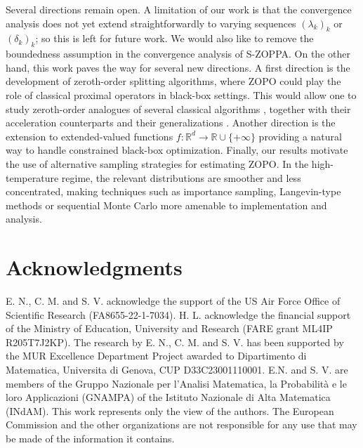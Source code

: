 \documentclass{article}
\begin{document}
Several directions remain open. A limitation of our work is that the convergence analysis does not yet extend straightforwardly to varying sequences \((\lambda_k)_k\) or
\((\delta_k)_k\); so this is left for future work. We would also like to remove the boundedness assumption in the convergence analysis of S-ZOPPA. On the other hand, this work paves the way for several new directions. A first direction is the development of zeroth-order splitting algorithms, where ZOPO could play the role of classical proximal operators in black-box settings. This would allow one to study zeroth-order analogues of several classical algorithms \cite{Rockafellar_FB,LionsMercier1979,Chambolle2011}, together with their acceleration counterparts \cite{FISTA, ChambolleDossal} and their generalizations \cite{BrediesChencheneNaldi2024,AkermanChencheneGiselssonNaldi2025}. Another direction is the extension to extended-valued functions \(f:\mathbb{R}^d\to\mathbb{R}\cup\{+\infty\}\) providing a natural way to handle constrained black-box optimization. Finally, our results motivate the use of alternative sampling strategies for estimating ZOPO. In the high-temperature regime, the relevant distributions are smoother and less concentrated, making techniques such as importance sampling, Langevin-type methods or sequential Monte Carlo more amenable to implementation and analysis. 



\section*{Acknowledgments}
E. N., C. M. and S. V. acknowledge the support of the US Air Force Office of Scientific Research (FA8655-22-1-7034). H. L. acknowledge the financial support of the Ministry of Education, University and Research (FARE grant ML4IP R205T7J2KP). The research by E. N., C. M. and S. V. has been supported by the MUR Excellence Department Project awarded to Dipartimento di Matematica, Universita di Genova, CUP D33C23001110001. E.N. and S. V. are members of the Gruppo Nazionale per l’Analisi Matematica, la Probabilità e le loro Applicazioni (GNAMPA) of the Istituto Nazionale di Alta Matematica (INdAM). This work represents only the view of the authors. The European Commission and the other organizations are not responsible for any use that may be made of the information it contains.






\end{document}
